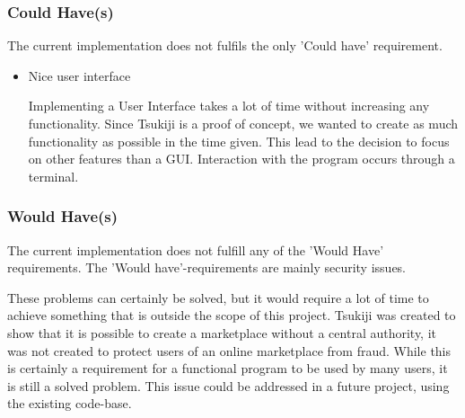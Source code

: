 \subsubsection{Could Have(s)}
The current implementation does not fulfils the only 'Could have' requirement.

\begin{itemize}
\item Nice user interface

Implementing a User Interface takes a lot of time without increasing any functionality.
Since Tsukiji is a proof of concept, we wanted to create as much functionality as possible in the time given.
This lead to the decision to focus on other features than a GUI.
Interaction with the program occurs through a terminal.
\end{itemize}

\subsubsection{Would Have(s)}
The current implementation does not fulfill any of the 'Would Have' requirements.
The 'Would have'-requirements are mainly security issues.

These problems can certainly be solved, but it would require a lot of time to achieve something that is outside the scope of this project.
Tsukiji was created to show that it is possible to create a marketplace without a central authority, it was not created to protect users of an online marketplace from fraud.
While this is certainly a requirement for a functional program to be used by many users, it is still a solved problem.
This issue could be addressed in a future project, using the existing code-base.

